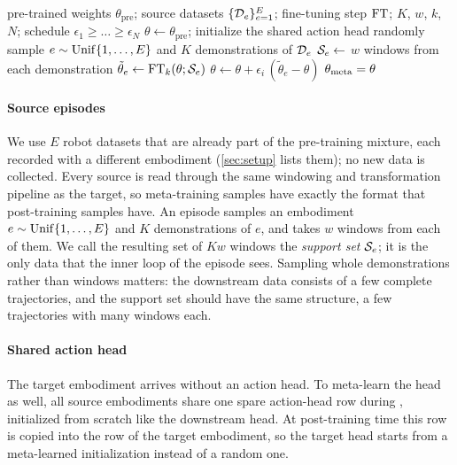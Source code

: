 \begin{algorithm}[t]
\caption{\Method}
\label{alg:meta}
\begin{algorithmic}[1]
\Require pre-trained weights $\theta_{\mathrm{pre}}$; source datasets $\{\mathcal{D}_e\}_{e=1}^{E}$; fine-tuning step $\mathrm{FT}$; $K$, $w$, $k$, $N$; schedule $\epsilon_1\ge\dots\ge\epsilon_N$
\State $\theta\gets\theta_{\mathrm{pre}}$; initialize the shared action head randomly
  \State sample $e\sim\operatorname{Unif}\{1,\dots,E\}$ and $K$ demonstrations of $\mathcal{D}_e$
  \State $\mathcal{S}_e\gets$ $w$ windows from each demonstration
  \State $\tilde\theta_e\gets\mathrm{FT}_k(\theta;\mathcal{S}_e)$ 
  \State $\theta\gets\theta+\epsilon_i\,(\tilde\theta_e-\theta)$
\EndFor
\State \Return $\theta_{\mathrm{meta}}=\theta$ 
\end{algorithmic}
\end{algorithm}

\paragraph{Source episodes}
We use $E$ robot datasets that are already part of the pre-training mixture, each recorded with a different embodiment (\cref{sec:setup} lists them); no new data is collected.
Every source is read through the same windowing and transformation pipeline as the target, so meta-training samples have exactly the format that post-training samples have.
An episode samples an embodiment $e\sim\operatorname{Unif}\{1,\dots,E\}$ and $K$ demonstrations of $e$, and takes $w$ windows from each of them.
We call the resulting set of $Kw$ windows the \emph{support set} $\mathcal{S}_e$; it is the only data that the inner loop of the episode sees.
Sampling whole demonstrations rather than windows matters: the downstream data consists of a few complete trajectories, and the support set should have the same structure, a few trajectories with many windows each.

\paragraph{Shared action head}
The target embodiment arrives without an action head.
To meta-learn the head as well, all source embodiments share one spare action-head row during \method, initialized from scratch like the downstream head.
At post-training time this row is copied into the row of the target embodiment, so the target head starts from a meta-learned initialization instead of a random one.

